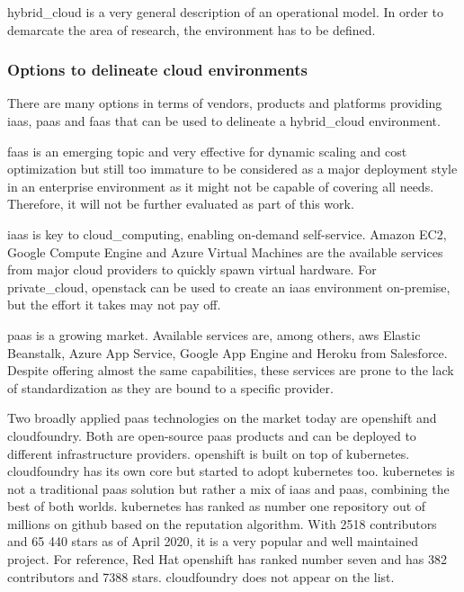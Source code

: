 \documentclass[../main.tex]{subfiles}
\begin{document}
    \Gls{hybrid_cloud} is a very general description of an operational model.
    In order to demarcate the area of research, the environment has to be defined.

    \subsubsection{Options to delineate cloud environments}

    There are many options in terms of vendors, products and platforms providing \acrshort{iaas}, \acrshort{paas} and \acrshort{faas} that can be used to delineate a \gls{hybrid_cloud} environment.

    \acrshort{faas} is an emerging topic and very effective for dynamic scaling and cost optimization but still too immature to be considered as a major deployment style in an enterprise environment as it might not be capable of covering all needs.
    Therefore, it will not be further evaluated as part of this work.\cite{faas_status}

    \acrshort{iaas} is key to \gls{cloud_computing}, enabling on-demand self-service.
    Amazon EC2, Google Compute Engine and Azure Virtual Machines are the available services from major \gls{cloud} providers to quickly spawn virtual hardware.
    For \gls{private_cloud}, \gls{openstack} can be used to create an \acrshort{iaas} environment on-premise, but the effort it takes may not pay off.

    \acrshort{paas} is a growing market.
    Available services are, among others, \acrshort{aws} Elastic Beanstalk, Azure App Service, Google App Engine and Heroku from Salesforce.
    Despite offering almost the same capabilities, these services are prone to the lack of standardization as they are bound to a specific provider.\cite{paas_players,gartner_paas_trends}

    Two broadly applied \acrshort{paas} technologies on the market today are \gls{openshift} and \gls{cloudfoundry}.
    Both are open-source \acrshort{paas} products and can be deployed to different infrastructure providers.
    \gls{openshift} is built on top of \gls{kubernetes}.
    \gls{cloudfoundry} has its own core but started to adopt \gls{kubernetes} too.
    \gls{kubernetes} is not a traditional \acrshort{paas} solution but rather a mix of \acrshort{iaas} and \acrshort{paas}, combining the best of both worlds.
    \gls{kubernetes} has ranked as number one repository out of millions on \gls{github} based on the  reputation algorithm.
    With 2518 contributors and 65 440 stars as of April 2020, it is a very popular and well maintained project.
    For reference, Red Hat \gls{openshift} has ranked number seven and has 382 contributors and 7388 stars.
    \gls{cloudfoundry} does not appear on the list.\cite{github_repo_ranking,github_kubernetes,github_openshift}
\end{document}
